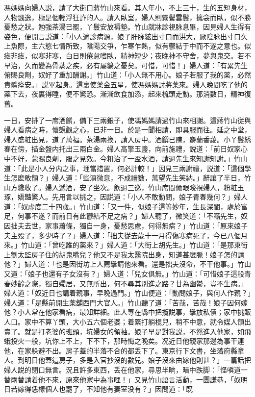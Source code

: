 馮媽媽向婦人説，請了大街口蔣竹山來看。其人年小，不上三十，生的五短身材，人物飄逸，極是個輕浮狂詐的人。請入臥室，婦人則霧鬢雲鬟，擁衾而臥，似不勝憂愁之狀。勉強茶湯已罷，丫鬟安放褥墊。竹山就牀診視脉息畢，因見婦人生得有姿色，便開言説道：「小人適診病源，娘子肝脉絃出寸口而洪大，厥陰脉出寸口久上魚際，主六慾七情所致，陰陽交爭，乍寒乍熱，似有鬱結于中而不遂之意也。似瘧非瘧，似寒非寒，白日則倦怠嗜臥，精神短少；夜晚神不守舍，夢與鬼交。若不早治，久而變為骨蒸之疾，必有屬纊之憂矣。可惜，可惜！」婦人道：「有累先生俯賜良劑，奴好了重加酬謝。」竹山道：「小人無不用心。娘子若服了我的薬，必然貴體痊安。」説畢起身。這裏使薬金五星，使馮媽媽討將薬來。婦人晚間吃了他的薬下去，夜裏得睡，便不驚恐。漸漸飲食加添，起來梳頭走動。那消數日，精神復舊。

一日，安排了一席酒餚，備下三兩銀子，使馮媽媽請過竹山來相謝。這蔣竹山従與婦人看病之時，懷覬覦之心，已非一日。於是一聞相請，即具服而往。延之中堂，婦人盛粧出見，道了萬福。茶湯兩換，請入房中。酒饌已陳，麝蘭香藹。小丫鬟綉春在傍，描金盤内托出三兩白金。婦人高擎玉盞，向前施禮，説道：「前日奴家心中不好，蒙賜良劑，服之見效。今粗治了一盃水酒，請過先生來知謝知謝。」竹山道：「此是小人分内之事，理當措置，何必計較！」因見三兩謝禮，説道：「這個學生怎麽敢領？」婦人道：「些湏微意，不成禮數，萬望先生笑納。」辭讓了半日，竹山方纔收了。婦人遞酒，安了坐次。飲過三巡，竹山席間偸眼睃視婦人，粉粧玉琢，嬌豔驚人。先用言以挑之，因説道：「小人不敢動問，娘子青春幾何？」婦人道：「奴虚度二十四歲。」竹山道：「又一件，似娘子這等妙年，生長深閨，處於富足，何事不遂？而前日有此鬱結不足之病？」婦人聽了，微笑道：「不瞞先生，奴因拙夫去世，家事蕭條，獨自一身，憂愁思慮，何得無病？」竹山道：「原來娘子夫主殁了，多少時了？」婦人道：「拙夫従去歲十一月得傷寒病死了，今已八個月來。」竹山道：「曾吃誰的薬來？」婦人道：「大街上胡先生。」竹山道：「是那東街上劉太監房子住的胡鬼嘴兒？他又不是我太醫院出身，知道甚麽脈！娘子怎的請他？」婦人道：「也是因街坊上人薦擧請他來看。還是拙夫沒命，不干他事。」竹山又道：「娘子也還有子女沒有？」婦人道：「兒女俱無。」竹山道：「可惜娘子這般青春妙齡之際，獨自孀居，又無所出，何不尋其別進之路？甘為幽鬱，豈不生病。」婦人道：「奴近日也講着親事，早晚過門。」竹山便道：「動問娘子，與何人作親？」婦人道：「是縣前開生薬舖西門大官人。」竹山聽了道：「苦哉，苦哉！娘子因何嫁他？小人常在他家看病，最知詳細。此人專在縣中把攬説事，擧放私債；家中挑販人口。家中不算丫頭，大小五六個老婆；着緊打躺棍兒，稍不中意，就令媒人領出賣了。就是打老婆的班頭，坑婦女的領袖。娘子早是對我説，不然進入他家，如飛蛾投火一般，坑你上不上，下不下，那時悔之晚矣。况近日他親家那邊為事干連他，在家躲避不出。房子蓋的半落不合的都丢下了。東京行下文書，坐落府縣拿人。到明日他蓋這房子，多是入官抄沒的數兒。娘子沒來由嫁他則甚？」一篇話把婦人説的閉口無言。況且許多東西，丢在他家，尋思半晌，暗中跌脚：「怪嗔道一替兩替請着他不來，原來他家中為事哩！」又見竹山語言活動，一團謙恭，「奴明日若嫁得恁樣個人也罷了，不知他有妻室没有？」因問道：「既